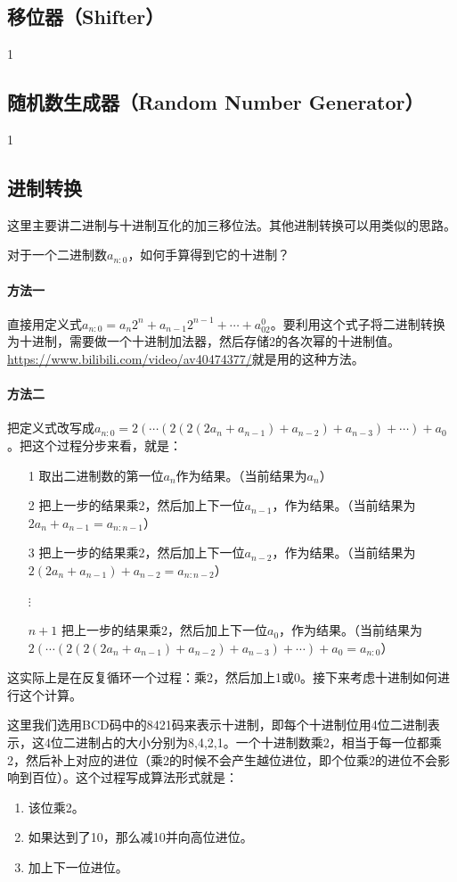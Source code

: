 \subsection{移位器（Shifter）}
1
\subsection{随机数生成器（Random Number Generator）}
1
\subsection{进制转换}
这里主要讲二进制与十进制互化的加三移位法。其他进制转换可以用类似的思路。

对于一个二进制数$a_{n:0}$，如何手算得到它的十进制？

\paragraph*{方法一} 直接用定义式$a_{n:0}=a_n2^n+a_{n-1}2^{n-1}+\cdots+a_02^0$。要利用这个式子将二进制转换为十进制，需要做一个十进制加法器，然后存储2的各次幂的十进制值。\url{https://www.bilibili.com/video/av40474377/}就是用的这种方法。

\paragraph*{方法二} 把定义式改写成$a_{n:0}=2(\cdots(2(2(2a_n+a_{n-1})+a_{n-2})+a_{n-3})+\cdots)+a_0$。把这个过程分步来看，就是：
\begin{itemize}
\item[1] 取出二进制数的第一位$a_n$作为结果。（当前结果为$a_n$）
\item[2] 把上一步的结果乘2，然后加上下一位$a_{n-1}$，作为结果。（当前结果为$2a_n+a_{n-1}=a_{n:n-1}$）
\item[3] 把上一步的结果乘2，然后加上下一位$a_{n-2}$，作为结果。（当前结果为$2(2a_n+a_{n-1})+a_{n-2}=a_{n:n-2}$）
\item[$\vdots$]
\item[$n+1$] 把上一步的结果乘2，然后加上下一位$a_0$，作为结果。（当前结果为$2(\cdots(2(2(2a_n+a_{n-1})+a_{n-2})+a_{n-3})+\cdots)+a_0=a_{n:0}$）
\end{itemize}
这实际上是在反复循环一个过程：乘2，然后加上1或0。接下来考虑十进制如何进行这个计算。

这里我们选用BCD码中的8421码来表示十进制，即每个十进制位用4位二进制表示，这4位二进制占的大小分别为8,4,2,1。一个十进制数乘2，相当于每一位都乘2，然后补上对应的进位（乘2的时候不会产生越位进位，即个位乘2的进位不会影响到百位）。这个过程写成算法形式就是：
\begin{enumerate}
\item 该位乘2。
\item 如果达到了10，那么减10并向高位进位。
\item 加上下一位进位。
\end{enumerate}

